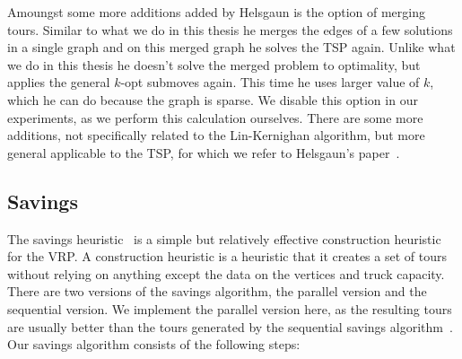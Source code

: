 \documentclass[12pt]{article}
\begin{document}
    Amoungst some more additions added by Helsgaun is the option of merging tours.
    Similar to what we do in this thesis he merges the edges of a few solutions in a single graph
    and on this merged graph he solves the TSP again.
    Unlike what we do in this thesis he doesn't solve the merged problem to optimality, but applies
    the general $k$-opt submoves again. This time he uses larger value of $k$, which he can do
    because the graph is sparse. We disable this option in our experiments, as we perform this
    calculation ourselves.
    There are some more additions, not specifically related to the Lin-Kernighan algorithm, but more
    general applicable to the TSP, for which we refer to Helsgaun's paper~\cite{lkh2}.


    \subsection{Savings}
    \label{sec:savings}
    The savings heuristic~\cite{savings} is a simple but relatively effective construction heuristic
    for the VRP\@. A construction heuristic is a heuristic that it creates a set of tours without
    relying on anything except the data on the vertices and truck capacity. There are two versions
    of the savings algorithm, the parallel version and the sequential version. We implement the
    parallel version here, as the resulting tours are usually better than the tours generated by the
    sequential savings algorithm~\cite{vrp-summary-1, vrp-summary-2}.
    Our savings algorithm consists of the following steps:
\end{document}
